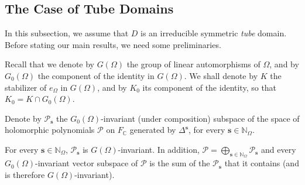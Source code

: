 \documentclass[10.5pt,reqno]{amsart}
\newcommand{\vect}[1]{\mathbf{{#1}}}
\newcommand{\N}{\mathds{N}}
\newcommand{\C}{\mathds{C}}
\newcommand{\Pc}{\mathcal{P}}
\begin{document}
\subsection{The Case of Tube Domains}\label{sec:3:2}




In this subsection, we assume that $D$ is an irreducible symmetric  \emph{tube} domain. Before stating our main results, we need some preliminaries.

Recall that we denote by $G(\Omega)$ the group of linear automorphisms of $\Omega$, and by $G_0(\Omega)$ the component of the identity in $G(\Omega)$. We shall denote by $K$ the stabilizer of $e_\Omega$ in $G(\Omega)$, and by $K_0$ its component of the identity, so that $K_0=K\cap G_0(\Omega)$.

\begin{deff}
Denote by $\Pc_{\vect s}$ the $G_0(\Omega)$-invariant (under composition) subspace of the space of holomorphic polynomials $\Pc$ on $F_\C$ generated by $\Delta^{\vect s}$, for every $\vect s\in \N_\Omega$. 
\end{deff}

\begin{prop}\label{prop:13}
	For every $\vect s\in \N_\Omega$, $\Pc_{\vect s}$ is $G(\Omega)$-invariant. In addition, $\Pc=\bigoplus_{\vect s\in \N_\Omega} \Pc_{\vect s}$ and every $G_0(\Omega)$-invariant  vector subspace of $\Pc$ is the sum of the $\Pc_{\vect s}$ that it contains (and is therefore $G(\Omega)$-invariant).
\end{prop}
\end{document}
